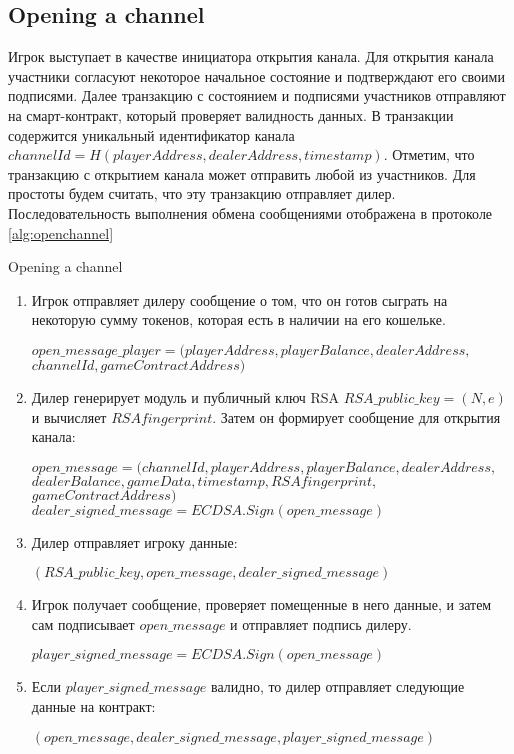 		\subsection {Opening a channel}
Игрок выступает в качестве инициатора открытия канала. Для открытия канала участники согласуют некоторое начальное состояние и подтверждают его своими подписями. Далее транзакцию с состоянием и подписями участников отправляют на смарт-контракт, который проверяет валидность данных. В транзакции содержится уникальный идентификатор канала $channelId = H(playerAddress,  dealerAddress, timestamp)$. Отметим, что транзакцию с открытием канала может отправить любой из участников. Для простоты будем считать, что эту транзакцию отправляет дилер. Последовательность выполнения обмена сообщениями отображена в протоколе \autoref {alg:openchannel}
\begin{algorithm}
\caption{Opening a channel} \label{alg:openchannel}
\begin{enumerate}
	\item Игрок отправляет дилеру сообщение о том, что он готов сыграть на некоторую сумму токенов, которая есть в наличии на его кошельке.
\begin{center}
	 $open\_message\_player = (playerAddress, playerBalance, dealerAddress,$\\$ channelId,gameContractAddress)$
\end{center}
	\item Дилер генерирует модуль и публичный ключ RSA $RSA\_public\_key= (N,e)$ и вычисляет $RSAfingerprint$. Затем он формирует сообщение для открытия канала:
\begin{center}
	 $open\_message = (channelId, playerAddress,  playerBalance, dealerAddress,$\\$dealerBalance, gameData, timestamp, RSAfingerprint,$\\$gameContractAddress)$
	$dealer\_signed\_message = ECDSA.Sign(open\_message)$
\end{center}
	\item Дилер отправляет игроку данные:
\begin{center}
$(RSA\_public\_key, open\_message,dealer\_signed\_message)$
\end{center}
	\item Игрок получает сообщение, проверяет помещенные в него данные, и затем сам подписывает $open\_message$ и отправляет подпись дилеру.
\begin{center}
	$player\_signed\_message = ECDSA.Sign(open\_message)$
\end{center}
	\item Если $player\_signed\_message$ валидно, то дилер отправляет следующие данные на контракт:
\begin{center}
$(open\_message,dealer\_signed\_message,player\_signed\_message)$
\end{center}
\end{enumerate}
\end{algorithm}
